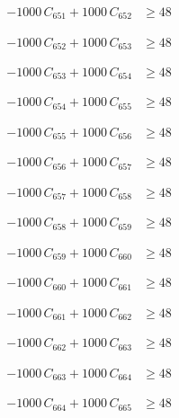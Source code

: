 \documentclass[a4paper,11pt]{article}
\begin{document}
\begin{align}
-1000\,C_{651} + 1000\,C_{652} &\geq 48 \nonumber
\end{align}

\begin{align}
-1000\,C_{652} + 1000\,C_{653} &\geq 48 \nonumber
\end{align}

\begin{align}
-1000\,C_{653} + 1000\,C_{654} &\geq 48 \nonumber
\end{align}

\begin{align}
-1000\,C_{654} + 1000\,C_{655} &\geq 48 \nonumber
\end{align}

\begin{align}
-1000\,C_{655} + 1000\,C_{656} &\geq 48 \nonumber
\end{align}

\begin{align}
-1000\,C_{656} + 1000\,C_{657} &\geq 48 \nonumber
\end{align}

\begin{align}
-1000\,C_{657} + 1000\,C_{658} &\geq 48 \nonumber
\end{align}

\begin{align}
-1000\,C_{658} + 1000\,C_{659} &\geq 48 \nonumber
\end{align}

\begin{align}
-1000\,C_{659} + 1000\,C_{660} &\geq 48 \nonumber
\end{align}

\begin{align}
-1000\,C_{660} + 1000\,C_{661} &\geq 48 \nonumber
\end{align}

\begin{align}
-1000\,C_{661} + 1000\,C_{662} &\geq 48 \nonumber
\end{align}

\begin{align}
-1000\,C_{662} + 1000\,C_{663} &\geq 48 \nonumber
\end{align}

\begin{align}
-1000\,C_{663} + 1000\,C_{664} &\geq 48 \nonumber
\end{align}

\begin{align}
-1000\,C_{664} + 1000\,C_{665} &\geq 48 \nonumber
\end{align}
\end{document}
